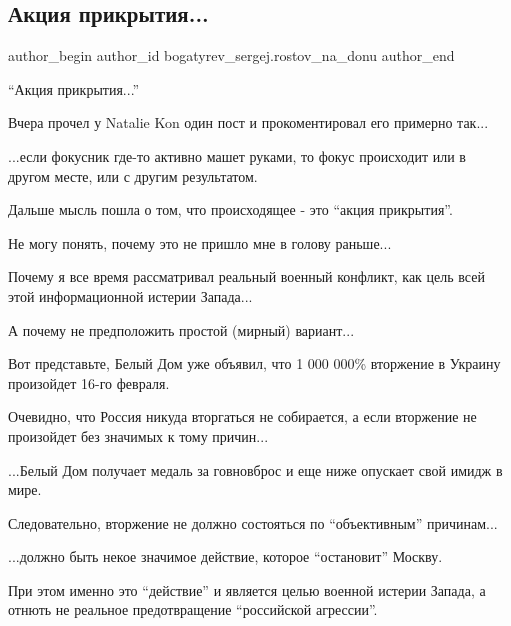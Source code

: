  
 
 
 
 
 
\subsection{Акция прикрытия...}
\label{sec:12_02_2022.fb.bogatyrev_sergej.rostov_na_donu.1.akcia_prikrytia}
 
\ifcmt
 author_begin
   author_id bogatyrev_sergej.rostov_na_donu
 author_end
\fi


\enquote{Акция прикрытия...} 

Вчера прочел у Natalie Kon один пост и прокоментировал его примерно так...

...если фокусник где-то активно машет руками, то фокус происходит или в другом
месте, или с другим результатом.

Дальше мысль пошла о том, что происходящее - это \enquote{акция прикрытия}.

Не могу понять, почему это не пришло мне в голову раньше...

Почему я все время рассматривал реальный военный конфликт, как цель всей этой
информационной истерии Запада... 

А почему не предположить простой (мирный) вариант...

Вот представьте, Белый Дом уже объявил, что 1 000 000\% вторжение в Украину
произойдет 16-го февраля. 

Очевидно, что Россия никуда вторгаться не собирается, а если вторжение не
произойдет без значимых к тому причин...

...Белый Дом получает медаль за говновброс и еще ниже опускает свой имидж в
мире. 

Следовательно, вторжение не должно состояться по \enquote{объективным} причинам...

...должно быть некое значимое действие, которое \enquote{остановит} Москву. 

При этом именно это \enquote{действие} и является целью военной истерии Запада, а
отнють не реальное предотвращение \enquote{российской агрессии}. 


